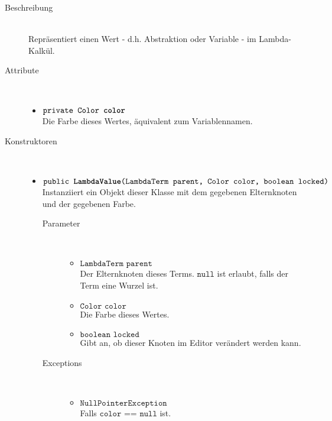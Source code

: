 \begin{description}
\item[Beschreibung] \hfill \\ Repräsentiert einen Wert - d.h. Abstraktion oder Variable - im Lambda-Kalkül.
\item[Attribute] \hfill \\
	\vspace{-.8cm}
	\begin{itemize}
		\item $\texttt{private Color \textbf{color}}$ \\ Die Farbe dieses Wertes, äquivalent zum Variablennamen.
	\end{itemize}
	
\item[Konstruktoren] \hfill \\
	\vspace{-.8cm}
	\begin{itemize}
		\item $\texttt{public \textbf{LambdaValue}(LambdaTerm parent, Color color, boolean locked)}$ \\ Instanziiert ein Objekt dieser Klasse mit dem gegebenen Elternknoten und der gegebenen Farbe.
		\begin{description}
			\item[Parameter] \hfill \\
			\vspace{-.8cm}
			\begin{itemize}
				\item $\texttt{LambdaTerm parent}$ \\ Der Elternknoten dieses Terms. $\texttt{null}$ ist erlaubt, falls der Term eine Wurzel ist.
				\item $\texttt{Color color}$ \\ Die Farbe dieses Wertes.
				\item $\texttt{boolean locked}$ \\ Gibt an, ob dieser Knoten im Editor verändert werden kann.
			\end{itemize}
			\item[Exceptions] \hfill \\
			\vspace{-.8cm}
			\begin{itemize}
				\item $\texttt{NullPointerException}$ \\ Falls $\texttt{color == null}$ ist.
			\end{itemize}
		\end{description}
	\end{itemize}
	

\end{description}
